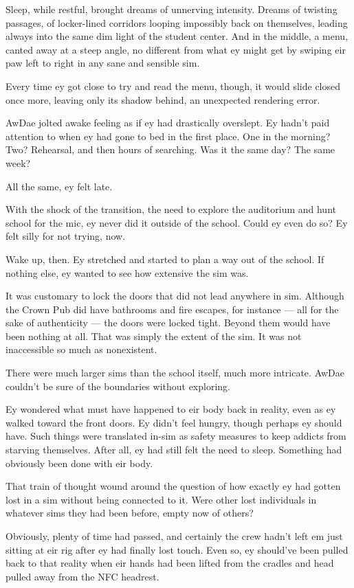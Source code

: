 Sleep, while restful, brought dreams of unnerving intensity. Dreams of twisting passages, of locker-lined corridors looping impossibly back on themselves, leading always into the same dim light of the student center. And in the middle, a menu, canted away at a steep angle, no different from what ey might get by swiping eir paw left to right in any sane and sensible sim.

Every time ey got close to try and read the menu, though, it would slide closed once more, leaving only its shadow behind, an unexpected rendering error.

AwDae jolted awake feeling as if ey had drastically overslept. Ey hadn't paid attention to when ey had gone to bed in the first place. One in the morning? Two? Rehearsal, and then hours of searching. Was it the same day? The same week?

All the same, ey felt late.

With the shock of the transition, the need to explore the auditorium and hunt school for the mic, ey never did it outside of the school. Could ey even do so? Ey felt silly for not trying, now.

Wake up, then. Ey stretched and started to plan a way out of the school. If nothing else, ey wanted to see how extensive the sim was.

It was customary to lock the doors that did not lead anywhere in sim. Although the Crown Pub did have bathrooms and fire escapes, for instance — all for the sake of authenticity — the doors were locked tight. Beyond them would have been nothing at all. That was simply the extent of the sim. It was not inaccessible so much as nonexistent.

There were much larger sims than the school itself, much more intricate. AwDae couldn't be sure of the boundaries without exploring.

Ey wondered what must have happened to eir body back in reality, even as ey walked toward the front doors. Ey didn't feel hungry, though perhaps ey should have. Such things were translated in-sim as safety measures to keep addicts from starving themselves. After all, ey had still felt the need to sleep. Something had obviously been done with eir body.

That train of thought wound around the question of how exactly ey had gotten lost in a sim without being connected to it. Were other lost individuals in whatever sims they had been before, empty now of others?

Obviously, plenty of time had passed, and certainly the crew hadn't left em just sitting at eir rig after ey had finally lost touch. Even so, ey should've been pulled back to that reality when eir hands had been lifted from the cradles and head pulled away from the NFC headrest.

